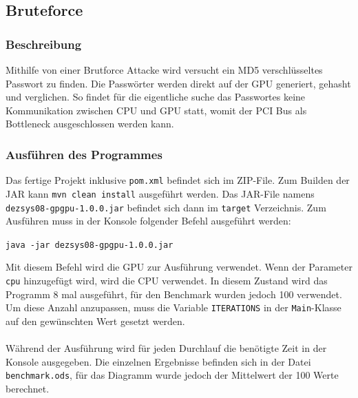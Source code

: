 \subsection{Bruteforce}
\subsubsection{Beschreibung}
Mithilfe von einer Brutforce Attacke wird versucht ein MD5 verschlüsseltes Passwort zu finden. Die Passwörter werden direkt auf der GPU generiert, gehasht und verglichen. So findet für die eigentliche suche das Passwortes keine Kommunikation zwischen CPU und GPU statt, womit der PCI Bus als Bottleneck ausgeschlossen werden kann.
\subsubsection{Ausführen des Programmes}
Das fertige Projekt inklusive \texttt{pom.xml} befindet sich im ZIP-File. Zum Builden der JAR kann \texttt{mvn clean install} ausgeführt werden. Das JAR-File namens \texttt{dezsys08-gpgpu-1.0.0.jar} befindet sich dann im \texttt{target} Verzeichnis. Zum Ausführen muss in der Konsole folgender Befehl ausgeführt werden:
\begin{center}
\texttt{java -jar dezsys08-gpgpu-1.0.0.jar}
\end{center}
Mit diesem Befehl wird die GPU zur Ausführung verwendet. Wenn der Parameter \texttt{cpu} hinzugefügt wird, wird die CPU verwendet. In diesem Zustand wird das Programm 8 mal ausgeführt, für den Benchmark wurden jedoch 100 verwendet. Um diese Anzahl anzupassen, muss die Variable \texttt{ITERATIONS} in der \texttt{Main}-Klasse auf den gewünschten Wert gesetzt werden. \\\\
Während der Ausführung wird für jeden Durchlauf die benötigte Zeit in der Konsole ausgegeben. Die einzelnen Ergebnisse befinden sich in der Datei \texttt{benchmark.ods}, für das Diagramm wurde jedoch der Mittelwert der 100 Werte berechnet.
\newpage

